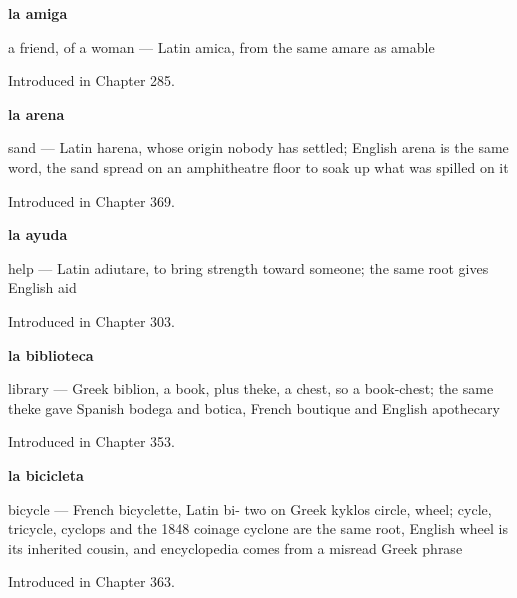 \noindent\begin{minipage}[t]{\linewidth}
\raggedright
\textbf{la amiga}\par
\small a friend, of a woman — Latin amica, from the same amare as amable\par
\footnotesize Introduced in Chapter 285.
\end{minipage}\par\medskip

\noindent\begin{minipage}[t]{\linewidth}
\raggedright
\textbf{la arena}\par
\small sand — Latin harena, whose origin nobody has settled; English arena is the same word, the sand spread on an amphitheatre floor to soak up what was spilled on it\par
\footnotesize Introduced in Chapter 369.
\end{minipage}\par\medskip

\noindent\begin{minipage}[t]{\linewidth}
\raggedright
\textbf{la ayuda}\par
\small help — Latin adiutare, to bring strength toward someone; the same root gives English aid\par
\footnotesize Introduced in Chapter 303.
\end{minipage}\par\medskip

\noindent\begin{minipage}[t]{\linewidth}
\raggedright
\textbf{la biblioteca}\par
\small library — Greek biblion, a book, plus theke, a chest, so a book-chest; the same theke gave Spanish bodega and botica, French boutique and English apothecary\par
\footnotesize Introduced in Chapter 353.
\end{minipage}\par\medskip

\noindent\begin{minipage}[t]{\linewidth}
\raggedright
\textbf{la bicicleta}\par
\small bicycle — French bicyclette, Latin bi- two on Greek kyklos circle, wheel; cycle, tricycle, cyclops and the 1848 coinage cyclone are the same root, English wheel is its inherited cousin, and encyclopedia comes from a misread Greek phrase\par
\footnotesize Introduced in Chapter 363.
\end{minipage}\par\medskip

